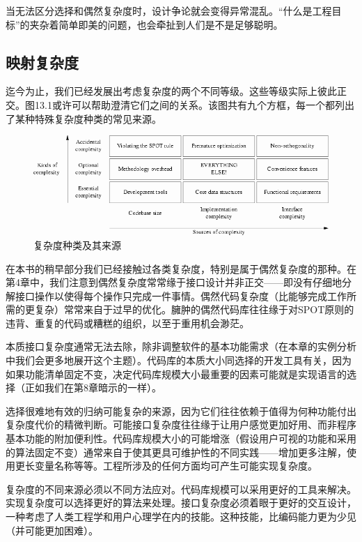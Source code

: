 \documentclass[12pt,oneside]{book}
\begin{document}
当无法区分选择和偶然复杂度时，设计争论就会变得异常混乱。“什么是工程目标”的夹杂着简单即美的问题，也会牵扯到人们是不是足够聪明。

\subsection{映射复杂度}
迄今为止，我们已经发展出考虑复杂度的两个不同等级。这些等级实际上彼此正交。图13.1或许可以帮助澄清它们之间的关系。该图共有九个方框，每一个都列出了某种特殊复杂度种类的常见来源。

\begin{figure}[H]
\centering
\includegraphics[width=\linewidth ,totalheight=0.95\textheight , keepaspectratio]{complexity.png}
\caption{复杂度种类及其来源}
\end{figure}


在本书的稍早部分我们已经接触过各类复杂度，特别是属于偶然复杂度的那种。在第4章中，我们注意到偶然复杂度常常缘于接口设计并非正交——即没有仔细地分解接口操作以使得每个操作只完成一件事情。偶然代码复杂度（比能够完成工作所需的更复杂）常常来自于过早的优化。臃肿的偶然代码库往往缘于对SPOT原则的违背、重复的代码或糟糕的组织，以至于重用机会渺茫。

本质接口复杂度通常无法去除，除非调整软件的基本功能需求（在本章的实例分析中我们会更多地展开这个主题）。代码库的本质大小同选择的开发工具有关，因为如果功能清单固定不变，决定代码库规模大小最重要的因素可能就是实现语言的选择（正如我们在第8章暗示的一样）。

选择很难地有效的归纳可能复杂的来源，因为它们往往依赖于值得为何种功能付出复杂度代价的精微判断。可能接口复杂度往往缘于让用户感觉更加好用、而非程序基本功能的附加便利性。代码库规模大小的可能增涨（假设用户可视的功能和采用的算法固定不变）通常来自于使其更具可维护性的不同实践——增加更多注解，使用更长变量名称等等。工程所涉及的任何方面均可产生可能实现复杂度。

复杂度的不同来源必须以不同方法应对。代码库规模可以采用更好的工具来解决。实现复杂度可以选择更好的算法来处理。接口复杂度必须着眼于更好的交互设计，一种考虑了人类工程学和用户心理学在内的技能。这种技能，比编码能力更为少见（并可能更加困难）。
\end{document}
